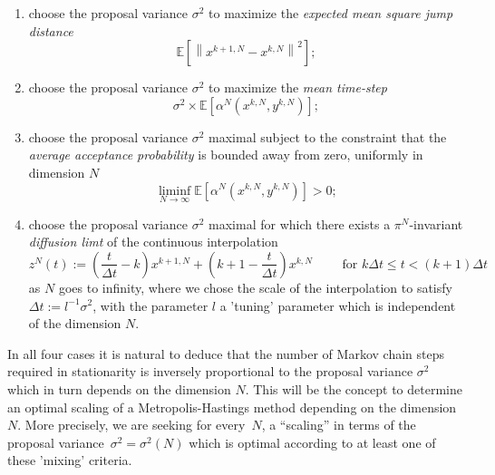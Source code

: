 \begin{enumerate}
 \item choose the proposal variance $ \sigma^2 $ to maximize the \textit{expected mean square jump distance}
 \begin{equation}
  \label{CC:Mean Square jump distance}
  \mathbb{E}\left[ \left\| x^{k+1,N} - x^{k,N}  \right\|^2 \right];
 \end{equation}
 
 \item choose the proposal variance $ \sigma^2 $ to maximize the \textit{mean time-step}
 \begin{equation}
  \label{CC:mean time-step}
  \sigma^2 \times \mathbb{E}\left[ \alpha^{N}\left(x^{k,N},y^{k,N}\right) \right];
 \end{equation}
 
 \item choose the proposal variance $ \sigma^2 $ maximal subject to the constraint that the \textit{average acceptance probability} is bounded away from zero, uniformly in dimension $N$
 \begin{equation}
  \label{CC:average acceptance probability}
  \liminf_{N \to \infty} \mathbb{E} \left[  \alpha^{N}\left(x^{k,N},y^{k,N}\right) \right] > 0;
 \end{equation}
 
 \item choose the proposal variance $ \sigma^2 $ maximal for which there exists a $ \pi^{N} $-invariant \textit{diffusion limt} of the continuous interpolation
 \begin{equation}
  \label{CC:Continuous interpolation}
  z^{N}(t) := \left( \frac{t}{\Delta t} -k \right) x^{k+1,N} + \left( k+1 - \frac{t}{\Delta t} \right) x^{k,N} \qquad \text{ for } k \Delta t \leq t < (k+1)\Delta t 
  \end{equation}
  as $N$ goes to infinity, where we chose the scale of the interpolation to satisfy $ \Delta t := l^{-1} \sigma^2  $, with the parameter $l$ a 'tuning' parameter which is independent of the dimension $N$.
 
\end{enumerate}

In all four cases it is natural to deduce that the number of Markov chain steps
required in stationarity is inversely proportional to the proposal variance $ \sigma^2 $ which in turn depends on the dimension $N$. This will be the concept to determine an optimal scaling of a Metropolis-Hastings method depending on the dimension $N$. More precisely, we are seeking for every~$N$, a ``scaling'' in terms of the proposal variance~$ \sigma^2 = \sigma^2 (N) $ which is optimal according to at least one of these 'mixing' criteria.


